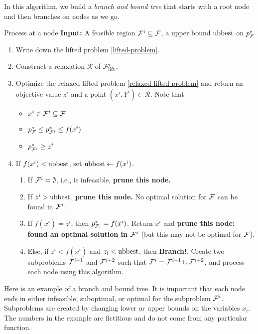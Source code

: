 In this algorithm, we build a \emph{branch and bound tree} that starts with a root node and then branches on nodes as we go.  

\begin{general}{Process at a node}{}
\textbf{Input:} A feasible region $\mathcal F^i \subseteq {\mathcal F}$, a upper bound $\mathrm{ubbest}$ on $p^*_{{\mathcal F}}$\\
\begin{enumerate}
\item Write down the lifted problem \eqref{lifted-problem}.
\item Construct a relaxation $\mathcal R$ of ${\mathcal F}_{\mathrm{lift}}^i$.
\item Optimize the relaxed lifted problem \eqref{relaxed-lifted-problem} and return an objective value $z^i$ and a point $(x^i,Y^i) \in \mathcal R$.   Note that 
\begin{itemize}
\item $x^i \in {\mathcal F}^i \subseteq {\mathcal F}$
\item $p^*_{\mathcal F} \leq p^*_{{\mathcal F}^i} \leq f(x^i)$
\item $p^*_{{\mathcal F}^i} \geq z^i$
\end{itemize}
\item If $f(x^i) < \mathrm{ubbest}$, set $\mathrm{ubbest} \leftarrow f(x^i)$.
\begin{enumerate}
\item If ${\mathcal F}^i = \emptyset$, i.e., is infeasible,  \textbf{prune this node.}
\item If $z^i > \mathrm{ubbest}$, \textbf{prune this node.}  No optimal solution for ${\mathcal F}$ can be found in ${\mathcal F}^i$.
\item If $f(x^i) = z^i$, then $p^*_{{\mathcal F}_i} = f(x^i)$.  Return $x^i$ and \textbf{prune this node: found an optimal solution in ${\mathcal F}^i$} (but this may not be optimal for ${\mathcal F}$).  
\item Else, if $z^i < f(x^i)$ and $z_i < \mathrm{ubbest}$, then \textbf{Branch!}.  Create two subproblems ${\mathcal F}^{i+1}$ and ${\mathcal F}^{i+2}$ such that ${\mathcal F}^i = {\mathcal F}^{i+1} \cup {\mathcal F}^{i+2}$, and process each node using this algorithm.
\end{enumerate}
\end{enumerate}


\end{general}
Here is an example of a branch and bound tree.  It is important that each node ends in either infeasible, suboptimal, or optimal for the subproblem ${\mathcal F}^i$.  Subproblems are created by changing lower or upper bounds on the variables $x_i$.   The numbers in the example are fictitious and do not come from any particular function.

